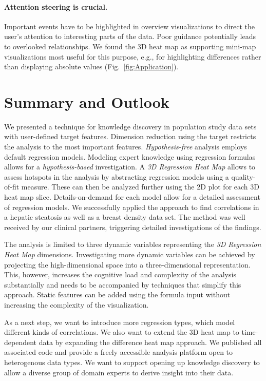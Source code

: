 \documentclass[journal]{style/vgtc} 			          %
\begin{document}
\paragraph{Attention steering is crucial.}
Important events have to be highlighted in overview visualizations to direct the user's attention to interesting parts of the data.
Poor guidance potentially leads to overlooked relationships.
We found the 3D heat map as supporting mini-map visualizations most useful for this purpose, e.g., for highlighting differences rather than displaying absolute values (Fig.~\ref{fig:Application}).
\section{Summary and Outlook}
We presented a technique for knowledge discovery in population study data sets with user-defined target features.
Dimension reduction using the target restricts the analysis to the most important features.
\emph{Hypothesis-free} analysis employs default regression models.
Modeling expert knowledge using regression formulas allows for a \emph{hypothesis-based} investigation.
A \emph{3D Regression Heat Map} allows to assess hotspots in the analysis by abstracting regression models using a quality-of-fit measure.
These can then be analyzed further using the 2D plot for each 3D heat map slice.
Details-on-demand for each model allow for a detailed assessment of regression models.
We successfully applied the approach to find correlations in a hepatic steatosis as well as a breast density data set.
The method was well received by our clinical partners, triggering detailed investigations of the findings.

The analysis is limited to three dynamic variables representing the \emph{3D Regression Heat Map} dimensions.
Investigating more dynamic variables can be achieved by projecting the high-dimensional space into a three-dimensional representation.
This, however, increases the cognitive load and complexity of the analysis substantially and needs to be accompanied by techniques that simplify this approach.
Static features can be added using the formula input without increasing the complexity of the visualization.

As a next step, we want to introduce more regression types, which model different kinds of correlations.
We also want to extend the 3D heat map to time-dependent data by expanding the difference heat map approach.
We published all associated code and provide a freely accessible analysis platform open to heterogenous data types.
We want to support opening up knowledge discovery to allow a diverse group of domain experts to derive insight into their data. %
\end{document}
